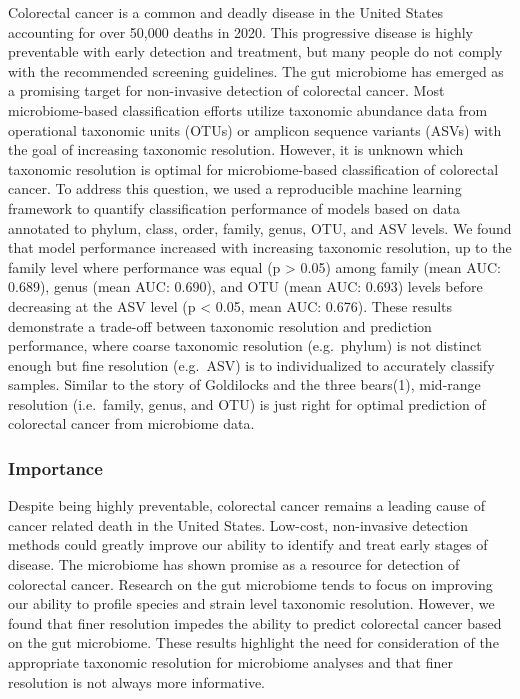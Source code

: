 \documentclass[
]{article}
\begin{document}
Colorectal cancer is a common and deadly disease in the United States
accounting for over 50,000 deaths in 2020. This progressive disease is
highly preventable with early detection and treatment, but many people
do not comply with the recommended screening guidelines. The gut
microbiome has emerged as a promising target for non-invasive detection
of colorectal cancer. Most microbiome-based classification efforts
utilize taxonomic abundance data from operational taxonomic units (OTUs)
or amplicon sequence variants (ASVs) with the goal of increasing
taxonomic resolution. However, it is unknown which taxonomic resolution
is optimal for microbiome-based classification of colorectal cancer. To
address this question, we used a reproducible machine learning framework
to quantify classification performance of models based on data annotated
to phylum, class, order, family, genus, OTU, and ASV levels. We found
that model performance increased with increasing taxonomic resolution,
up to the family level where performance was equal (p \textgreater{}
0.05) among family (mean AUC: 0.689), genus (mean AUC: 0.690), and OTU
(mean AUC: 0.693) levels before decreasing at the ASV level (p
\textless{} 0.05, mean AUC: 0.676). These results demonstrate a
trade-off between taxonomic resolution and prediction performance, where
coarse taxonomic resolution (e.g.~phylum) is not distinct enough but
fine resolution (e.g.~ASV) is to individualized to accurately classify
samples. Similar to the story of Goldilocks and the three bears(1),
mid-range resolution (i.e.~family, genus, and OTU) is just right for
optimal prediction of colorectal cancer from microbiome data.

\hypertarget{importance}{%
\subsubsection{Importance}\label{importance}}

Despite being highly preventable, colorectal cancer remains a leading
cause of cancer related death in the United States. Low-cost,
non-invasive detection methods could greatly improve our ability to
identify and treat early stages of disease. The microbiome has shown
promise as a resource for detection of colorectal cancer. Research on
the gut microbiome tends to focus on improving our ability to profile
species and strain level taxonomic resolution. However, we found that
finer resolution impedes the ability to predict colorectal cancer based
on the gut microbiome. These results highlight the need for
consideration of the appropriate taxonomic resolution for microbiome
analyses and that finer resolution is not always more informative.
\end{document}

